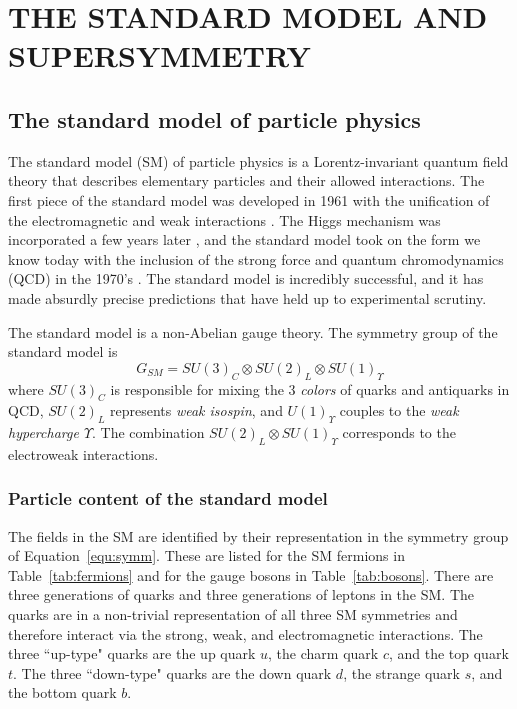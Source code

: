 \chapter{THE STANDARD MODEL AND SUPERSYMMETRY}
\label{chap:theory}

\section{The standard model of particle physics}
\label{sec:StandardModel}
The standard model (SM) of particle physics is a Lorentz-invariant quantum field theory that describes elementary particles and their allowed interactions.
The first piece of the standard model was developed in 1961 with the unification of the electromagnetic and weak interactions 
\cite{GLASHOW1961579,Glashow:1970gm}. 
The Higgs mechanism was incorporated a few years later 
\cite{PhysRev.127.965,PhysRevLett.13.508,PhysRevLett.13.321,Guralnik:1964eu}, and 
the standard model took on the form we know today with the inclusion of the strong force and quantum chromodynamics (QCD) in the 1970's \cite{PhysRevLett.19.1264}.
The standard model is incredibly successful, and it has made absurdly precise predictions that have held up to experimental scrutiny. 

The standard model is a non-Abelian gauge theory. The symmetry group of the standard model is 
\begin{equation}
G_{SM} = SU(3)_C \otimes SU(2)_L \otimes SU(1)_\Upsilon
\label{equ:symm}
\end{equation}
where $SU(3)_C$ is responsible for mixing the 3 \textit{colors} of quarks and antiquarks in QCD, $SU(2)_L$ represents \textit{weak isospin}, and $U(1)_\Upsilon$ couples to the \textit{weak hypercharge $\Upsilon$}. The combination $SU(2)_L \otimes SU(1)_\Upsilon$ corresponds to the electroweak interactions. 

\subsection{Particle content of the standard model}
\label{sec:SMparts}
The fields in the SM are identified by their representation in the symmetry group of Equation~\ref{equ:symm}. These are listed for the SM fermions in Table~\ref{tab:fermions} and for the gauge bosons in Table~\ref{tab:bosons}. There are three generations of quarks and three generations of leptons in the SM. The quarks are in a non-trivial representation of all three SM symmetries and therefore interact via the strong, weak, and electromagnetic interactions. The three ``up-type" quarks are the up quark $u$, the charm quark $c$, and the top quark $t$. The three ``down-type" quarks are the down quark $d$, the strange quark $s$, and the bottom quark $b$. 

